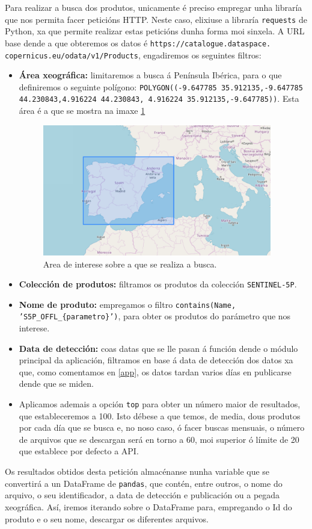 Para realizar a busca dos produtos, unicamente é preciso empregar unha libraría que nos permita facer peticións HTTP. Neste caso, elixiuse a libraría \texttt{requests} de Python, xa que permite
realizar estas peticións dunha forma moi sinxela. A URL base dende a que obteremos os datos é \texttt{https://catalogue.dataspace. copernicus.eu/odata/v1/Products}, engadiremos os seguintes filtros:
\begin{itemize}
    \item \textbf{Área xeográfica:} limitaremos a busca á Península Ibérica, para o que definiremos o seguinte polígono: \texttt{POLYGON((-9.647785 35.912135,-9.647785 44.230843,4.916224 44.230843,
        4.916224 35.912135,-9.647785))}.
    Esta área é a que se mostra na imaxe \ref{areainterese}
    \begin{figure}
        \centerline{\includegraphics[width=10cm]{figuras/area.png}}
        \caption{Area de interese sobre a que se realiza a busca.}
        \label{areainterese}
    \end{figure}
    \item \textbf{Colección de produtos:} filtramos os produtos da colección \texttt{SENTINEL-5P}.
    \item \textbf{Nome de produto:} empregamos o filtro \texttt{contains(Name, 'S5P\_OFFL\_\{parametro\}')}, para obter os produtos do parámetro que nos interese.
    \item \textbf{Data de detección:} coas datas que se lle pasan á función dende o módulo principal da aplicación, filtramos en base á data de detección dos datos xa que, como comentamos en \ref{app}, os
    datos tardan varios días en publicarse dende que se miden.
    \item Aplicamos ademais a opción \texttt{top} para obter un número maior de resultados, que estableceremos a 100. Isto débese a que temos, de media, dous produtos por cada día que se busca e,
    no noso caso, ó facer buscas mensuais, o número de arquivos que se descargan será en torno a 60, moi superior ó límite de 20 que establece por defecto a API.
\end{itemize}
Os resultados obtidos desta petición almacénanse nunha variable que se convertirá a un DataFrame de \texttt{pandas}, que contén, entre outros, o nome do arquivo, o seu identificador, a data de
detección e publicación ou a pegada xeográfica. Así, iremos iterando sobre o DataFrame para, empregando o Id do produto e o seu nome, descargar os diferentes arquivos.

